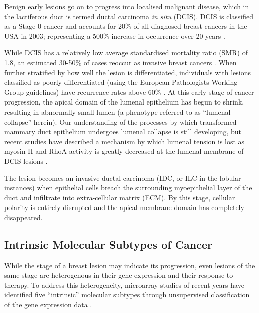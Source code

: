 %
%


Benign early lesions go on to progress into localised malignant disease, which in the lactiferous duct is termed ductal carcinoma {\it in situ} (DCIS). DCIS is classified as a Stage 0 cancer and accounts for 20\% of all diagnosed breast cancers in the USA in 2003; representing a 500\% increase in occurrence over 20 years \citep{bleicher2013, kerlikowske2010}.\par

While DCIS has a relatively low average standardised mortality ratio (SMR) of 1.8, an estimated 30-50\% of cases reoccur as invasive breast cancers \citep{narod2015,page1982,betsill1978}. When further stratified by how well the lesion is differentiated, individuals with lesions classified as poorly differentiated (using the European Pathologists Working Group guidelines) have recurrence rates above 60\% \citep{badve1998}. At this early stage of cancer progression, the apical domain of the lumenal epithelium has begun to shrink, resulting in abnormally small lumen (a phenotype referred to as ``lumenal collapse'' herein). Our understanding of the processes by which transformed mammary duct epithelium undergoes lumenal collapse is still developing, but recent studies have described a mechanism by which lumenal tension is lost as myosin II and RhoA activity is greatly decreased at the lumenal membrane of DCIS lesions \citep{halaoui2017}. \par

The lesion becomes an invasive ductal carcinoma (IDC, or ILC in the lobular instances) when epithelial cells breach the surrounding myoepithelial layer of the duct and infiltrate into extra-cellular matrix (ECM). By this stage, cellular polarity is entirely disrupted and the apical membrane domain has completely disappeared.\par

\subsection{Intrinsic Molecular Subtypes of Cancer}

While the stage of a breast lesion may indicate its progression, even lesions of the same stage are heterogenous in their gene expression and their response to therapy. To address this heterogeneity, microarray studies of recent years have identified five ``intrinsic'' molecular subtypes through unsupervised classification of the gene expression data \citep{perou2000,prat2015}. \par

